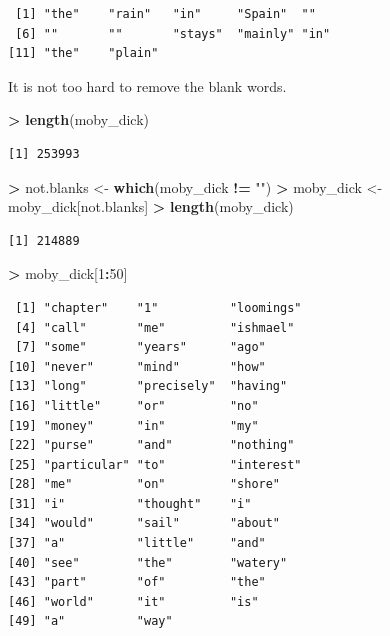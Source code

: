 \documentclass[]{krantz}
\makeatletter
\newenvironment{Shaded}{\begin{snugshade}}{\end{snugshade}}
\newcommand{\KeywordTok}[1]{\textcolor[rgb]{0.27,0.27,0.27}{\textbf{#1}}}
\newcommand{\DecValTok}[1]{\textcolor[rgb]{0.06,0.06,0.06}{#1}}
\newcommand{\StringTok}[1]{\textcolor[rgb]{0.5,0.5,0.5}{#1}}
\newcommand{\OperatorTok}[1]{\textcolor[rgb]{0.43,0.43,0.43}{\textbf{#1}}}
\newcommand{\NormalTok}[1]{#1}
\newenvironment{kframe}{%
\medskip{}
\setlength{\fboxsep}{.8em}
 \def\at@end@of@kframe{}%
 \ifinner\ifhmode%
  \def\at@end@of@kframe{\end{minipage}}%
  \begin{minipage}{\columnwidth}%
 \fi\fi%
 \def\FrameCommand##1{\hskip\@totalleftmargin \hskip-\fboxsep
 \colorbox{shadecolor}{##1}\hskip-\fboxsep
     \hskip-\linewidth \hskip-\@totalleftmargin \hskip\columnwidth}%
 \MakeFramed {\advance\hsize-\width
   \@totalleftmargin\z@ \linewidth\hsize
   \@setminipage}}%
 {\par\unskip\endMakeFramed%
 \at@end@of@kframe}
\renewenvironment{Shaded}{\begin{kframe}}{\end{kframe}}
\makeatother
\begin{document}
\begin{verbatim}
 [1] "the"    "rain"   "in"     "Spain"  ""      
 [6] ""       ""       "stays"  "mainly" "in"    
[11] "the"    "plain" 
\end{verbatim}

It is not too hard to remove the blank words.

\begin{Shaded}
\begin{Highlighting}[]
\OperatorTok{>}\StringTok{ }\KeywordTok{length}\NormalTok{(moby_dick)}
\end{Highlighting}
\end{Shaded}

\begin{verbatim}
[1] 253993
\end{verbatim}

\begin{Shaded}
\begin{Highlighting}[]
\OperatorTok{>}\StringTok{ }\NormalTok{not.blanks <-}\StringTok{ }\KeywordTok{which}\NormalTok{(moby_dick }\OperatorTok{!=}\StringTok{ ""}\NormalTok{)}
\OperatorTok{>}\StringTok{ }\NormalTok{moby_dick <-}\StringTok{ }\NormalTok{moby_dick[not.blanks]}
\OperatorTok{>}\StringTok{ }\KeywordTok{length}\NormalTok{(moby_dick)}
\end{Highlighting}
\end{Shaded}

\begin{verbatim}
[1] 214889
\end{verbatim}

\begin{Shaded}
\begin{Highlighting}[]
\OperatorTok{>}\StringTok{ }\NormalTok{moby_dick[}\DecValTok{1}\OperatorTok{:}\DecValTok{50}\NormalTok{]}
\end{Highlighting}
\end{Shaded}

\begin{verbatim}
 [1] "chapter"    "1"          "loomings"  
 [4] "call"       "me"         "ishmael"   
 [7] "some"       "years"      "ago"       
[10] "never"      "mind"       "how"       
[13] "long"       "precisely"  "having"    
[16] "little"     "or"         "no"        
[19] "money"      "in"         "my"        
[22] "purse"      "and"        "nothing"   
[25] "particular" "to"         "interest"  
[28] "me"         "on"         "shore"     
[31] "i"          "thought"    "i"         
[34] "would"      "sail"       "about"     
[37] "a"          "little"     "and"       
[40] "see"        "the"        "watery"    
[43] "part"       "of"         "the"       
[46] "world"      "it"         "is"        
[49] "a"          "way"       
\end{verbatim}
\end{document}
